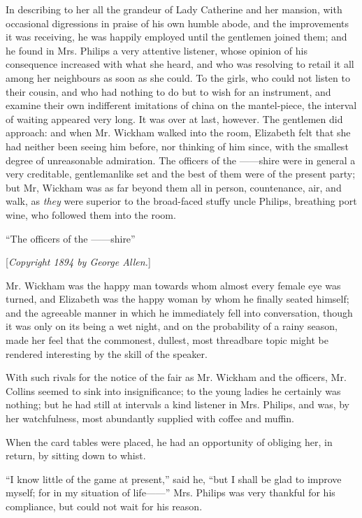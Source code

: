 \documentclass[12pt,openright]{book}
\begin{document}
In describing to her all the grandeur of Lady Catherine and her mansion, with occasional digressions in praise of his own humble abode, and the improvements it was receiving, he was happily employed until the gentlemen joined them; and he found in Mrs. Philips a very attentive listener, whose opinion of his consequence increased with what she heard, and who was resolving to retail it all among her neighbours as soon as she could. To the girls, who could not listen to their cousin, and who had nothing to do but to wish for an instrument, and examine their own indifferent imitations of china on the mantel-piece, the interval of waiting appeared very long. It was over at last, however. The gentlemen did approach: and when Mr. Wickham walked into the room, Elizabeth felt that she had neither been seeing him before, nor thinking of him since, with the smallest degree of unreasonable admiration. The officers of the ——shire were in general a very creditable, gentlemanlike set and the best of them were of the present party; but Mr, Wickham was as far beyond them all in person, countenance, air, and walk, as \textit{they} were superior to the broad-faced stuffy uncle Philips, breathing port wine, who followed them into the room.

“The officers of the ——shire”


[\textit{Copyright 1894 by George Allen.}]

Mr. Wickham was the happy man towards whom almost every female eye was turned, and Elizabeth was the happy woman by whom he finally seated himself; and the agreeable manner in which he immediately fell into conversation, though it was only on its being a wet night, and on the probability of a rainy season, made her feel that the commonest, dullest, most threadbare topic might be rendered interesting by the skill of the speaker.

With such rivals for the notice of the fair as Mr. Wickham and the officers, Mr. Collins seemed to sink into insignificance; to the young ladies he certainly was nothing; but he had still at intervals a kind listener in Mrs. Philips, and was, by her watchfulness, most abundantly supplied with coffee and muffin.

When the card tables were placed, he had an opportunity of obliging her, in return, by sitting down to whist.

“I know little of the game at present,” said he, “but I shall be glad to improve myself; for in my situation of life——” Mrs. Philips was very thankful for his compliance, but could not wait for his reason.
\end{document}
